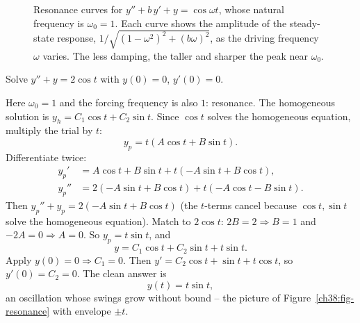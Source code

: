 \begin{figure}[htbp]
\centering
{}
\caption{Resonance curves for $y'' + b\,y' + y = \cos\omega t$, whose natural
frequency is $\omega_0 = 1$. Each curve shows the amplitude of the steady-state
response, $1/\sqrt{(1-\omega^2)^2 + (b\omega)^2}$, as the driving frequency
$\omega$ varies. The less damping, the taller and sharper the peak near
$\omega_0$.}
\label{ch38:fig-resonance-curve}
\end{figure}

\begin{example}
\label{ch38:ex-resonance}
Solve $y'' + y = 2\cos t$ with $y(0) = 0$, $y'(0) = 0$.

Here $\omega_0 = 1$ and the forcing frequency is also $1$: resonance. The
homogeneous solution is $y_h = C_1 \cos t + C_2 \sin t$. Since $\cos t$ solves the
homogeneous equation, multiply the trial by $t$:
\[
  y_p = t(A\cos t + B\sin t).
\]
Differentiate twice:
\begin{align*}
  y_p'  &= A\cos t + B\sin t + t(-A\sin t + B\cos t), \\
  y_p'' &= 2(-A\sin t + B\cos t) + t(-A\cos t - B\sin t).
\end{align*}
Then $y_p'' + y_p = 2(-A\sin t + B\cos t)$ (the $t$-terms cancel because $\cos t,
\sin t$ solve the homogeneous equation). Match to $2\cos t$: $2B = 2 \Rightarrow B
= 1$ and $-2A = 0 \Rightarrow A = 0$. So $y_p = t\sin t$, and
\[
  y = C_1\cos t + C_2 \sin t + t\sin t.
\]
Apply $y(0) = 0 \Rightarrow C_1 = 0$. Then $y' = C_2\cos t + \sin t + t\cos t$, so
$y'(0) = C_2 = 0$. The clean answer is
\[
  y(t) = t\sin t,
\]
an oscillation whose swings grow without bound -- the picture of
Figure~\ref{ch38:fig-resonance} with envelope $\pm t$.
\end{example}

